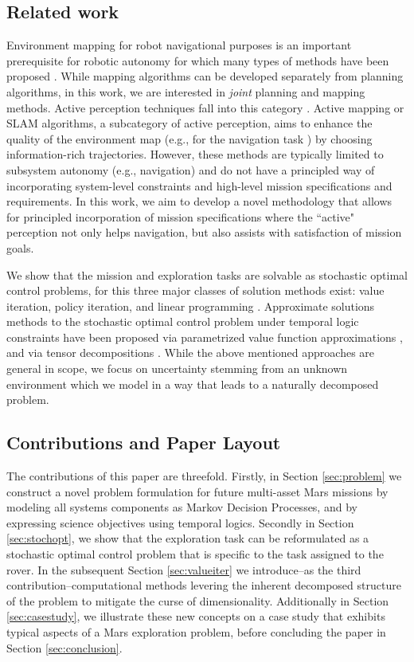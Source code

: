 \documentclass[conference]{IEEEtran}
\renewcommand{\cite}[1]{\citep{#1}}
\begin{document}
\subsection{Related work}
Environment mapping for robot navigational purposes is an important prerequisite for robotic autonomy for which many types of methods have been proposed \cite{Thrun2005,stachniss2009_book,thrun2002robotic}. While mapping algorithms can be developed separately from planning algorithms, in this work, we are interested in \emph{joint} planning and mapping methods. Active perception techniques fall into this category \cite{blake1992active, aloimonos1988active,soatto2013actionable}. Active mapping or SLAM algorithms, a subcategory of active perception, aims to enhance the quality of the environment map (e.g., for the navigation task \cite{Agha2017_ISRR,feder1999adaptive,davison2002simultaneous,Mu16-CDC}) by choosing information-rich trajectories. However, these methods are typically limited to subsystem autonomy (e.g., navigation) and do not have a principled way of incorporating system-level constraints and high-level mission specifications and requirements. In this work, we aim to develop a novel methodology that allows for principled incorporation of mission specifications where the ``active" perception not only helps navigation, but also assists with satisfaction of mission goals.

We show that the mission and exploration tasks are solvable as   stochastic optimal control problems, for this 
three major classes of solution methods exist: value iteration, policy iteration, and linear programming \cite{Bertsekas1978}. Approximate solutions methods to the stochastic optimal control problem under temporal logic constraints have been proposed via parametrized value function approximations \cite{Papusha2016,Leong2016}, and via tensor decompositions \cite{Alora2016}. While the above mentioned approaches are general in scope, we focus on uncertainty stemming from an unknown environment which we model in a way that leads to a naturally decomposed problem.


\subsection{Contributions and Paper Layout}

The contributions of this paper are threefold. Firstly, in Section \ref{sec:problem} we construct a novel problem formulation for future multi-asset Mars missions by modeling all systems components as Markov Decision Processes, and by expressing science objectives using temporal logics. Secondly in Section \ref{sec:stochopt}, we show that the exploration task can be reformulated as a stochastic optimal control problem that is specific to the task assigned to the rover. In the subsequent Section \ref{sec:valueiter} we introduce--as the third contribution--computational methods levering the inherent decomposed structure of the problem to mitigate the curse of dimensionality. Additionally in Section \ref{sec:casestudy}, we illustrate these new concepts on a case study that exhibits typical aspects of a Mars exploration problem, before concluding the paper in Section \ref{sec:conclusion}.
\end{document}

